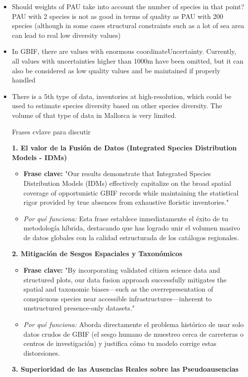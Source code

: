 \documentclass{article}
\begin{document}
\begin{itemize}
    \item Should weights of PAU take into account the number of species in that point? PAU with 2 species is not as good in terms of quality as PAU with 200 species (although in some cases structural constraints such as a lot of sea area can lead to real low diversity values)
    \item In GBIF, there are values with enormous coordinateUncertainty. Currently, all values with uncertainties higher than 1000m have been omitted, but it can also be considered as low quality values and be maintained if properly handled
    \item There is a 5th type of data, inventories at high-resolution, which could be used to estimate species diversity based on other species diversity. The volume of that type of data in Mallorca is very limited. 

Frases cvlave para discutir

\textbf{1. El valor de la Fusión de Datos (Integrated Species Distribution Models - IDMs)}

\begin{itemize}
        \item \textbf{Frase clave:} "Our results demonstrate that Integrated Species Distribution Models (IDMs) effectively capitalize on the broad spatial coverage of opportunistic GBIF records while maintaining the statistical rigor provided by true absences from exhaustive floristic inventories."
        \item \textit{Por qué funciona:} Esta frase establece inmediatamente el éxito de tu metodología híbrida, destacando que has logrado unir el volumen masivo de datos globales con la calidad estructurada de los catálogos regionales.
\end{itemize}
\textbf{2. Mitigación de Sesgos Espaciales y Taxonómicos}

\begin{itemize}
        \item \textbf{Frase clave:} "By incorporating validated citizen science data and structured plots, our data fusion approach successfully mitigates the spatial and taxonomic biases—such as the overrepresentation of conspicuous species near accessible infrastructures—inherent to unstructured presence-only datasets."
        \item \textit{Por qué funciona:} Aborda directamente el problema histórico de usar solo datos crudos de GBIF (el sesgo humano de muestreo cerca de carreteras o centros de investigación) y justifica cómo tu modelo corrige estas distorsiones.
\end{itemize}
\textbf{3. Superioridad de las Ausencias Reales sobre las Pseudoausencias}


\end{itemize}
\end{document}
